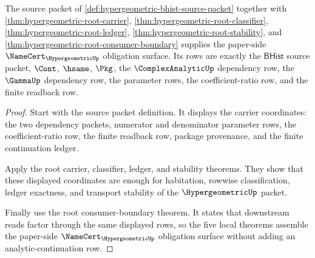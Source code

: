 \begin{theorem}
\label{thm:hypergeometric-namecert-obligation-surface}
The source packet of \autoref{def:hypergeometric-bhist-source-packet} together
with \autoref{thm:hypergeometric-root-carrier},
\autoref{thm:hypergeometric-root-classifier},
\autoref{thm:hypergeometric-root-ledger},
\autoref{thm:hypergeometric-root-stability}, and
\autoref{thm:hypergeometric-root-consumer-boundary} supplies the paper-side
$\NameCert_{\HypergeometricUp}$ obligation surface. Its rows are exactly the
$\mathsf{BHist}$ source packet, $\Cont$, $\hsame$, $\Pkg$, the
$\ComplexAnalyticUp$ dependency row, the $\GammaUp$ dependency row, the
parameter rows, the coefficient-ratio row, and the finite readback row.
\end{theorem}
\begin{proof}
Start with the source packet definition. It displays the carrier coordinates:
the two dependency packets, numerator and denominator parameter rows, the
coefficient-ratio row, the finite readback row, package provenance, and the
finite continuation ledger.

Apply the root carrier, classifier, ledger, and stability theorems. They show
that these displayed coordinates are enough for habitation, rowwise
classification, ledger exactness, and transport stability of the
$\HypergeometricUp$ packet.

Finally use the root consumer-boundary theorem. It states that downstream reads
factor through the same displayed rows, so the five local theorems assemble the
paper-side $\NameCert_{\HypergeometricUp}$ obligation surface without adding an
analytic-continuation row.
\end{proof}

